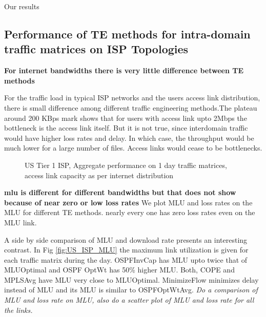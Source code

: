 \documentclass[a4paper,10pt]{article}
\begin{document}
Our results 

\subsection{Performance of TE methods for intra-domain traffic matrices on ISP Topologies}

\textbf{For internet bandwidths there is very little difference between TE methods}

For the traffic load in typical ISP networks and the users access link distribution, there is small difference among different traffic engineering methods.The plateau around 200 KBps mark shows that for users with access link upto 2Mbps the bottleneck is the access link itself. But it is not true, since interdomain traffic would have higher loss rates and delay. In which case, the throughput would be much lower for a large number of files. Access links would cease to be bottlenecks.

\begin{figure}[htp]
  \begin{center}
  \end{center}
  \caption{US Tier 1 ISP, Aggregate performance on 1 day traffic matrices, access link capacity as per internet distribution }
  \label{fig:usisp_aggregate_internetBW}
\end{figure}



\textbf{mlu is different for different bandwidths but that does not show because of near zero or low loss rates}
We plot MLU and loss rates on the MLU for different TE methods. nearly every one has zero loss rates even on the MLU link. 


A side by side comparison of MLU and download rate presents an interesting contrast. In Fig \ref{fig:US_ISP_MLU} the maximum link utilization is given for each traffic matrix during the day. OSPFInvCap has MLU upto twice that of MLUOptimal and OSPF OptWt has 50\% higher MLU. Both, COPE and MPLSAvg have MLU very close to MLUOptimal. MinimizeFlow minimizes delay instead of MLU and its MLU is similar to OSPFOptWtAvg.  \emph{Do a comparison of MLU and loss rate on MLU, also do a scatter plot of MLU and loss rate for all the links.}
\end{document}
